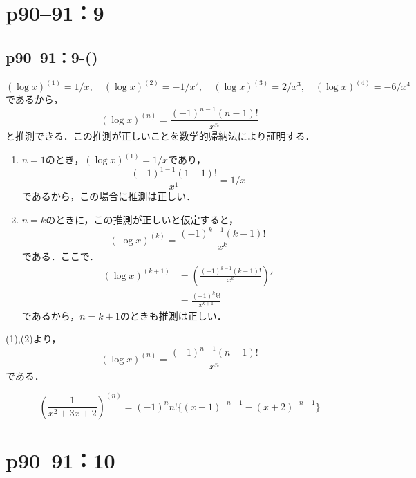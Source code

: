 \section*{p90--91：9}

\subsection*{p90--91：9-()}

\begin{tanswer}
    \[
        ( \log x )^{(1)}= 1/x , \quad (\log x)^{(2)} = - 1/x^2 , \quad (\log x)^{(3)} = 2/x^3,\quad (\log x)^{(4)} = - 6 /x^4
    \]
    であるから，
    \[
        (\log x)^{(n)} = \frac{(-1)^{n-1}  (n-1)!}{x^n}
    \]
    と推測できる．この推測が正しいことを数学的帰納法により証明する．
    \begin{enumerate}
        \item $n=1$のとき，$(\log x)^{(1)} = 1/x$であり，
              \[
                  \frac{(-1)^{1-1}  (1-1)!}{x^1}=1/x
              \]
              であるから，この場合に推測は正しい．
        \item $n=k$のときに，この推測が正しいと仮定すると，
              \[
                  (\log x)^{(k)} = \frac{(-1)^{k-1}  (k-1)!}{x^k}
              \]
              である．ここで．
              \begin{align*}
                  (\log x)^{(k+1)} & = \left (\frac{(-1)^{k-1}  (k-1)!}{x^k} \right ) ' \\
                                   & = \frac{(-1)^k  k!}{x^{k+1}}
              \end{align*}
              であるから，$n=k+1$のときも推測は正しい．
    \end{enumerate}
    (1),(2)より，
    \[
        (\log x)^{(n)} = \frac{(-1)^{n-1}  (n-1)!}{x^n}
    \]
    である．
\end{tanswer}

\begin{tanswer}
    \[
        \left(   \frac{1}{x^2+3x+2} \right)^{(n)} = (-1)^n n! \{ (x+1)^{-n-1} - (x+2)^{-n-1} \}
    \]
\end{tanswer}



\section*{p90--91：10}


